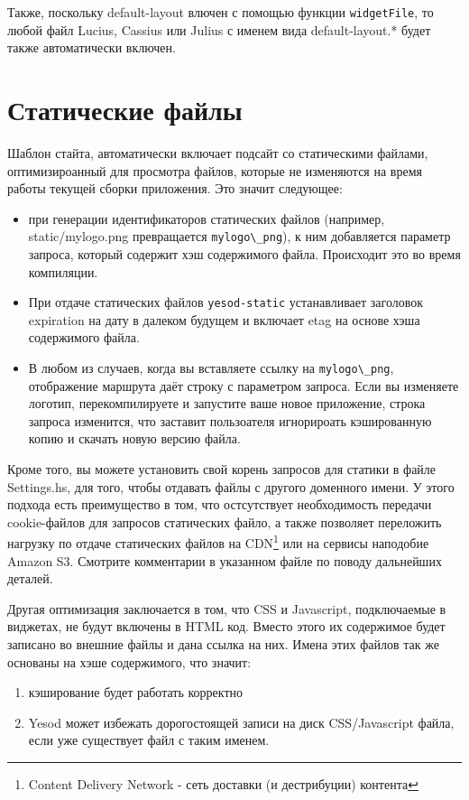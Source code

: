 Также, поскольку default-layout влючен с помощью функции \lstinline!widgetFile!, то любой
файл Lucius, Cassius или Julius с именем вида default-layout.* будет также автоматически включен.

\section{Статические файлы}
Шаблон стайта, автоматически включает подсайт со статическими файлами, оптимизироанный для просмотра
файлов, которые не изменяются на время работы текущей сборки приложения. Это значит следующее:

\begin{itemize}
  \item при генерации идентификаторов статических файлов (например, static/mylogo.png
    превращается  \lstinline!mylogo\_png!), к ним добавляется параметр запроса, который содержит
    хэш содержимого файла. Происходит это во время компиляции.
  \item При отдаче статических файлов \lstinline!yesod-static! устанавливает заголовок expiration
    на дату в далеком будущем и включает etag на основе хэша содержимого файла.
  \item В любом из случаев, когда вы вставляете  ссылку на \lstinline!mylogo\_png!, отображение
    маршрута даёт строку с параметром запроса. Если вы изменяете логотип, перекомпилируете и
    запустите ваше новое приложение, строка запроса изменится, что заставит пользоателя игнорироать
    кэшированную копию и скачать новую версию файла.
\end{itemize}

Кроме того, вы можете установить свой корень запросов для статики в файле Settings.hs, для того, чтобы
отдавать файлы  с другого доменного имени. У этого подхода есть преимущество в том, что остсутствует
необходимость передачи cookie-файлов для запросов статических файло, а также позволяет переложить
нагрузку по отдаче статических файлов на CDN\footnote{Content Delivery Network - сеть доставки (и
дестрибуции) контента} или на сервисы наподобие Amazon S3. Смотрите комментарии в указанном файле
по поводу дальнейших деталей.

Другая оптимизация заключается в том, что CSS и Javascript, подключаемые в виджетах, не будут
включены в HTML код. Вместо этого их содержимое будет записано во внешние файлы и дана ссылка на них.
Имена этих файлов так же основаны на хэше содержимого, что значит:
\begin{enumerate}
  \item кэширование будет работать корректно
  \item Yesod может избежать дорогостоящей записи на диск CSS/Javascript файла, если уже существует
    файл с таким именем.
\end{enumerate}

